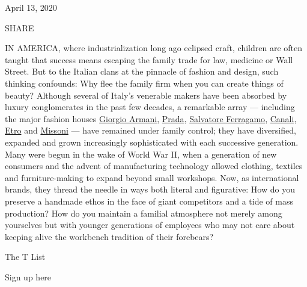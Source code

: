 April 13, 2020

SHARE

IN AMERICA, where industrialization long ago eclipsed craft, children
are often taught that success means escaping the family trade for law,
medicine or Wall Street. But to the Italian clans at the pinnacle of
fashion and design, such thinking confounds: Why flee the family firm
when you can create things of beauty? Although several of Italy's
venerable makers have been absorbed by luxury conglomerates in the past
few decades, a remarkable array --- including the major fashion houses
\href{https://www.armani.com/us/armanicom}{Giorgio Armani},
\href{https://www.prada.com/us/en.html}{Prada},
\href{https://www.ferragamo.com/shop/us/en}{Salvatore Ferragamo},
\href{https://www.canali.com/en_us/homepage.html}{Canali},
\href{https://www.etro.com/us-en/}{Etro} and
\href{https://www.missoni.com/us}{Missoni} --- have remained under
family control; they have diversified, expanded and grown increasingly
sophisticated with each successive generation. Many were begun in the
wake of World War II, when a generation of new consumers and the advent
of manufacturing technology allowed clothing, textiles and
furniture-making to expand beyond small workshops. Now, as international
brands, they thread the needle in ways both literal and figurative: How
do you preserve a handmade ethos in the face of giant competitors and a
tide of mass production? How do you maintain a familial atmosphere not
merely among yourselves but with younger generations of employees who
may not care about keeping alive the workbench tradition of their
forebears?

The T List \textbar{}

Sign up here

